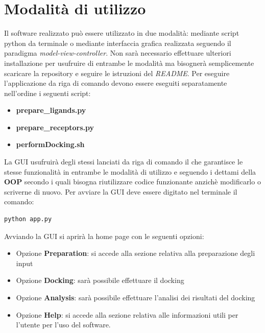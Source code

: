 \section{Modalità di utilizzo}
Il software realizzato può essere utilizzato in due modalità: mediante script python da terminale o mediante interfaccia grafica realizzata seguendo il paradigma \textit{model-view-controller}.\newline
Non sarà necessario effettuare ulteriori installazione per usufruire di entrambe le modalità ma bisognerà semplicemente scaricare la repository e seguire le istruzioni del \textit{README}.\newline
Per eseguire l'applicazione da riga di comando devono essere eseguiti separatamente nell'ordine i seguenti script:
\begin{itemize}
    \item \textbf{prepare\_ligands.py}
    \item \textbf{prepare\_receptors.py}
    \item \textbf{performDocking.sh}
\end{itemize}

La GUI usufruirà degli stessi lanciati da riga di comando il che garantisce le stesse funzionalità in entrambe le modalità di utilizzo e seguendo i dettami della \textbf{OOP} secondo i quali bisogna riutilizzare codice funzionante anzichè modificarlo o scriverne di nuovo.\newline
Per avviare la GUI deve essere digitato nel terminale il comando:

\begin{lstlisting}[language=bash, label=lst:code2, caption={Comando per avviare la GUI}]
python app.py    
\end{lstlisting}

Avviando la GUI si aprirà la home page con le seguenti opzioni:

\begin{itemize}
    \item Opzione \textbf{Preparation}: si accede alla sezione relativa alla preparazione degli input
    \item Opzione \textbf{Docking}: sarà possibile effettuare il docking
    \item Opzione \textbf{Analysis}: sarà possibile effettuare l'analisi dei risultati del docking
    \item Opzione \textbf{Help}: si accede alla sezione relativa alle informazioni utili per l'utente per l'uso del software.
\end{itemize}

